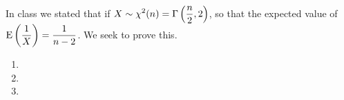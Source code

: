 In class we stated that if $\displaystyle X \sim \chi^2 (n) = \Gamma\pars{ \frac{n}{2}, 2}$, so that the expected value of $\displaystyle \E{\over{X}} = \over{n-2}$. We seek to prove this.
\begin{enumerate}[label={(\alph*)}]
    \item 
    \item 
    \item 
\end{enumerate}